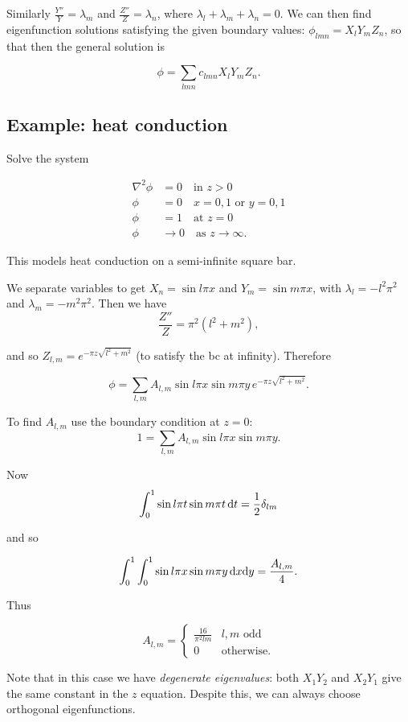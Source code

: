\documentclass{notes}
\theoremstyle{plain}
\begin{document}
Similarly $\frac{Y''}{Y} = \lambda_m$ and $\frac{Z''}{Z} = \lambda_n$,
where $\lambda_l + \lambda_m + \lambda_n = 0$.  We can then find eigenfunction
solutions satisfying the given boundary values: $\phi_{lmn} = X_l
Y_m Z_n$, so that then the general solution is

\[
\phi = \sum_{lmn} c_{lmn} X_l Y_m Z_n.
\]

\subsection*{Example: heat conduction}

Solve the system

\begin{align*}
\nabla^2 \phi &= 0 \quad \text{in $z>0$} \\
\phi &= 0 \quad \text{$x=0,1$ or $y=0,1$} \\
\phi &= 1 \quad \text{at $z=0$} \\
\phi &\to 0 \quad \text{as $z \to \infty$.}
\end{align*}

This models heat conduction on a semi-infinite square bar.

We separate variables to get $X_n = \sin l \pi x$ and $Y_m = \sin m
\pi x$, with $\lambda_l = -l^2 \pi^2$ and $\lambda_m = - m^2 \pi^2$.
Then we have
\[
\frac{Z''}{Z} = \pi^2 (l^2 + m^2),
\]

and so $Z_{l,m} = e^{-\pi z \sqrt{l^2 + m^2}}$ (to satisfy the bc at
infinity).  Therefore

\[
\phi = \sum_{l,m} A_{l,m} \sin l \pi x \sin m \pi y\, e^{-\pi z
  \sqrt{l^2 + m^2}}.
\]

To find $A_{l,m}$ use the boundary condition at $z=0$:
\[
1 = \sum_{l,m} A_{l,m} \sin l \pi x \sin m \pi y.
\]

Now
\[
\int_0^1 \sin l \pi t \sin m \pi t \, \mathrm{d} t
= \frac{1}{2} \delta_{lm}
\]

and so

\[
\int_0^1 \int_0^1 \sin l \pi x \sin m \pi y\, \mathrm{d} x \mathrm{d} y = \frac{A_{l,m}}{4}.
\]

Thus

\[
A_{l,m} = \begin{cases}
\frac{16}{\pi^2 l m} & l,m \text{ odd} \\
0 & \text{otherwise.}
\end{cases}
\]

Note that in this case we have \emph{degenerate eigenvalues}: both
$X_1 Y_2$ and $X_2 Y_1$ give the same constant in the $z$ equation.
Despite this, we can always choose orthogonal eigenfunctions.
\end{document}
